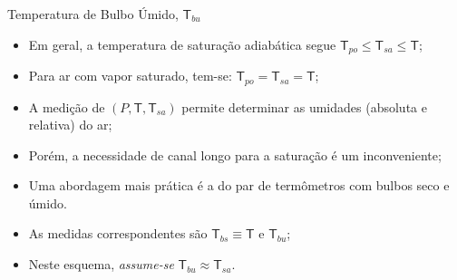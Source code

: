     \begin{frame}{Temperatura de Bulbo Úmido, $\mathsf{T}_{bu}$}\vspace*{-0em}
        \begin{itemize}
            \item<1-> Em geral, a temperatura de saturação adiabática segue
                \alert{$\mathsf{T}_{po} \leqslant \mathsf{T}_{sa} \leqslant \mathsf{T}$};
                \\[\medskipamount]
            \item<2-> Para ar com vapor saturado, tem-se: \alert{$\mathsf{T}_{po} =
                \mathsf{T}_{sa} = \mathsf{T}$};
                \\[\medskipamount]
            \item<3-> A medição de \alert{$(P, \mathsf{T}, \mathsf{T}_{sa})$} permite determinar
                as umidades (absoluta e relativa) do ar;
                \\[\medskipamount]
            \item<4-> Porém, a necessidade de \alert{canal longo} para a saturação é um
                inconveniente;
                \\[\medskipamount]
            \item<5-> Uma abordagem mais prática é a do \alert{par} de termômetros com
                \alert{bulbos seco e úmido}.
                \\[\medskipamount]
            \item<6-> As medidas correspondentes são \alert{$\mathsf{T}_{bs} \equiv \mathsf{T}$}
                e \alert{$\mathsf{T}_{bu}$};
                \\[\medskipamount]
            \item<7-> Neste esquema, \alert{\textit{assume-se} $\mathsf{T}_{bu} \approx
                \mathsf{T}_{sa}$}.
        \end{itemize}
    \end{frame}

    \begin{frame}\vspace*{-0em}
    \end{frame}

